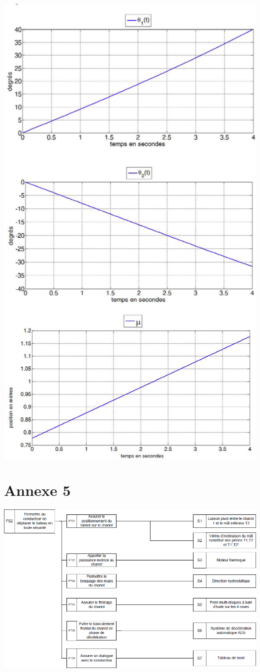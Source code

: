 \documentclass[10pt,fleqn]{article} %
\begin{document}
\begin{center}
\includegraphics[width=.7\linewidth]{images/ann_04}
\end{center}

\newpage
\section*{Annexe 5}

\begin{center}
\includegraphics[width=1.\linewidth]{images/ann_05}
\end{center}
\end{document}
